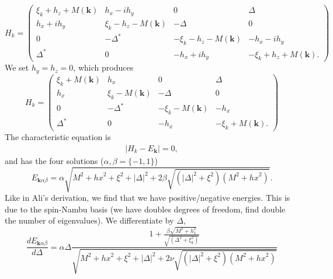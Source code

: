 \documentclass[aps,onecolumn,amsmath,amssymb,preprintnumbers,floatfix,prl,superscriptaddress,longbibliography]{revtex4-2}%
\renewcommand\vec{\mathbf}
\begin{document}
\begin{equation}
    H_k = 
    \begin{pmatrix}
        \xi_k + h_z + M(\vec k) & h_x - i h_y & 0 & \Delta\\
        h_x + i h_y & \xi_k - h_z - M(\vec k) & - \Delta & 0\\
        0 & - \Delta^* & -\xi_k - h_z - M(\vec k)  & - h_x - i h_y\\
        \Delta^* & 0 & -h_x + i h_y & -\xi_k + h_z + M(\vec k). 
    \end{pmatrix}
\end{equation}
We set $h_y = h_z = 0$, which produces
\begin{equation}
    H_k = 
    \begin{pmatrix}
        \xi_k  + M(\vec k) & h_x  & 0 & \Delta\\
        h_x  & \xi_k  - M(\vec k) & - \Delta & 0\\
        0 & - \Delta^* & -\xi_k  - M(\vec k)  & - h_x \\
        \Delta^* & 0 & -h_x  & -\xi_k  + M(\vec k). 
    \end{pmatrix}
\end{equation}
The characteristic equation is
\begin{align}
    |H_k - E_{\vec k}| = 0,
\end{align}
and has the four solutions ($\alpha,\beta = \{-1, 1\}$)
\begin{equation}
    E_{\vec{k} \alpha \beta} = \alpha \sqrt{M^{2}+\mathit{hx}^{2}
    +\xi^{2}+{| \Delta |}^{2}+ 2 \beta  \sqrt{\left({| \Delta |}^{2}+\xi^{2}\right) \left(M^{2}+\mathit{hx}^{2}\right)}}.
\end{equation}
Like in Ali's derivation, we find that we have positive/negative energies. This is due to the spin-Nambu basis (we have doubles degrees of freedom, find double the number of eigenvalues).
We differentiate by $\Delta$,
\begin{equation}
    \frac{d E_{\vec{k} \alpha \beta}}{d\Delta} = 
    \alpha \Delta \frac{1 + \frac{\beta \sqrt{M^2 + h_x^2}}{\sqrt{(\Delta^2 + \xi_k^2)}}}{\sqrt{M^{2}+\mathit{hx}^{2}
    +\xi^{2}+{| \Delta |}^{2}+ 2 \nu  \sqrt{\left({| \Delta |}^{2}+\xi^{2}\right) \left(M^{2}+\mathit{hx}^{2}\right)}}}
\end{equation}
\end{document}
